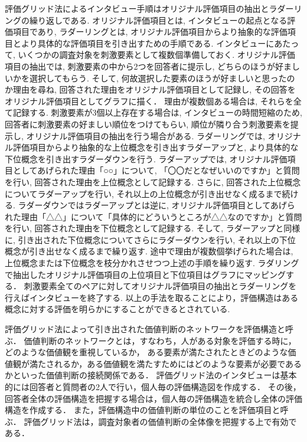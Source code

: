 \documentclass[syuuron]{kuee}
\begin{document}
		評価グリッド法によるインタビュー手順はオリジナル評価項目の抽出とラダーリングの繰り返しである. 
		オリジナル評価項目とは, インタビューの起点となる評価項目であり, 
		ラダーリングとは, オリジナル評価項目からより抽象的な評価項目とより具体的な評価項目を引き出すための手順である. 
		インタビューにあたって, いくつかの調査対象を刺激要素として複数個準備しておく. 
		オリジナル評価項目の抽出では, 刺激要素の中から2つを回答者に提示し, どちらのほうが好ましいかを選択してもらう. 
		そして, 何故選択した要素のほうが好ましいと思ったのか理由を尋ね, 回答された理由をオリジナル評価項目として記録し, その回答をオリジナル評価項目としてグラフに描く．
		理由が複数個ある場合は, それらを全て記録する. 
		刺激要素が3個以上存在する場合は, インタビューの時間短縮のため, 回答者に刺激要素の好ましい順位をつけてもらい, 順位が隣り合う刺激要素を提示し, 
		オリジナル評価項目の抽出を行う場合がある. 
		ラダーリングでは, オリジナル評価項目からより抽象的な上位概念を引き出すラダーアップと, 
		より具体的な下位概念を引き出すラダーダウンを行う. 
		ラダーアップでは, オリジナル評価項目としてあげられた理由「○○」について, 「〇〇だとなぜいいのですか」と質問を行い, 回答された理由を上位概念として記録する. 
		さらに, 回答された上位概念についてラダーアップを行い, それ以上の上位概念が引き出せなく成るまで続ける. 
		ラダーダウンではラダーアップとは逆に, オリジナル評価項目としてあげられた理由「△△」について「具体的にどういうところが△△なのですか」と質問を行い, 
		回答された理由を下位概念として記録する. 
		そして, ラダーアップと同様に, 引き出された下位概念についてさらにラダーダウンを行い, それ以上の下位概念が引き出せなく成るまで繰り返す. 
		途中で理由が複数個挙げられた場合は, 上位概念または下位概念を枝分かれさせつつ上述の手順を繰り返す. 
		ラダリングで抽出したオリジナル評価項目の上位項目と下位項目はグラフにマッピングする．
		刺激要素全てのペアに対してオリジナル評価項目の抽出とラダーリングを行えばインタビューを終了する. 
		以上の手法を取ることにより，評価構造はある概念に対する評価を明らかにすることができるとされている. 
		
		評価グリッド法によって引き出された価値判断のネットワークを評価構造と呼ぶ．
		価値判断のネットワークとは，すなわち，人がある対象を評価する時に，どのような価値観を重視しているか，
		ある要素が満たされたときどのような価値観が満たされるか，ある価値観を満たすためにはどのような要素が必要であるかといった価値判断の接続関係である．
		評価グリッド法のインタビューは基本的には回答者と質問者の2人で行い，個人毎の評価構造図を作成する．
		その後，回答者全体の評価構造を把握する場合は，個人毎の評価構造を統合し全体の評価構造を作成する．
		また，評価構造中の価値判断の単位のことを評価項目と呼ぶ．
		評価グリッド法は，調査対象者の価値判断の全体像を把握する上で有効である．
		
\end{document}
